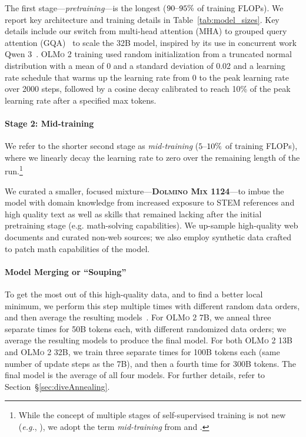 \documentclass[table]{ai2style/ai2}
\newcommand{\olmotoo}{\textsc{OLMo 2}\xspace}
\newcommand{\dolminos}{\textsc{Dolmino Mix 1124}\xspace}
\begin{document}
The first stage---\textit{pretraining}---is the longest ($90\textup{--}95\%$ of training FLOPs).
We report key architecture and training details in Table~\ref{tab:model_sizes}.
Key details include our switch from multi-head attention (MHA) to grouped query attention (GQA)~\citep{ainslie-etal-2023-gqa} to scale the 32B model, inspired by its use in concurrent work Qwen 3~\citep{yang2025qwen3technicalreport}.
\olmotoo training used random initialization from a truncated normal distribution with a mean of 0 and a standard deviation of 0.02 and a learning rate schedule that warms up the learning rate from 0 to the peak learning rate over 2000 steps, followed by a cosine decay calibrated to reach 10\% of the peak learning rate after a specified max tokens.

\paragraph{Stage 2: Mid-training}
We refer to the shorter second stage as \textit{mid-training}  ($5\textup{--}10\%$ of training FLOPs), where we linearly decay the learning rate to zero over the remaining length of the run.\footnote{While the concept of multiple stages of self-supervised training is not new (\textit{e.g.}, \citealt{gururangan2020dontStopPretraining}), we adopt the term \textit{mid-training} from \citet{abdin2024phi} and \citet{openai2024midtraining}.}

We curated a smaller, focused mixture---\textbf{\dolminos}---to imbue the model with domain knowledge from increased exposure to STEM references and high quality text as well as skills that remained lacking after the initial pretraining stage (e.g. math-solving capabilities). 
We up-sample high-quality web documents and curated non-web sources;
we also employ synthetic data crafted to patch math capabilities of the model. 

\paragraph{Model Merging or ``Souping''}
To get the most out of this high-quality data, and to find a better local minimum, we perform this step multiple times with different random data orders, and then average the resulting models~\citep{matena2022mergingmodelsfisherweightedaveraging,modelsoups}. 
For \olmotoo 7B, we anneal three separate times for 50B tokens each, with different randomized data orders; 
we average the resulting models to produce the final model.
For both \olmotoo 13B and \olmotoo 32B, we train three separate times for 100B tokens each (same number of update steps as the 7B), and then a fourth time for 300B tokens.
The final model is the average of all four models.
For further details, refer to Section~\S\ref{sec:diveAnnealing}.
\end{document}

